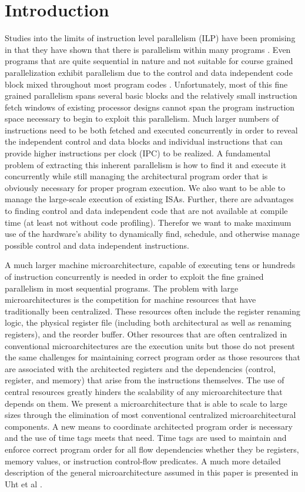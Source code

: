 \documentclass[10pt,dvips]{article}
\begin{document}
\section{Introduction}
%
Studies into the limits of instruction level parallelism (ILP) have
been promising in that they have shown that there is parallelism within
many programs \cite{Lam92,Gon97}.  
Even programs that are quite sequential in nature and
not suitable for course grained parallelization exhibit parallelism due
to the control and data independent code block mixed throughout most
program codes \cite{Uht95}. 
Unfortunately, most of this fine grained
parallelism spans several basic blocks and the relatively small
instruction fetch windows of existing processor designs cannot span
the program instruction space necessary to begin to exploit this
parallelism.  Much larger numbers of instructions need to be both fetched
and executed concurrently in order to reveal the independent control
and data blocks and individual instructions that can provide higher
instructions per clock (IPC) to be realized.  A fundamental problem of
extracting this inherent parallelism is how to find it and execute it
concurrently while still managing the architectural program order that
is obviously necessary for proper program execution.
We also want to be able to manage the large-scale execution of
existing ISAs.  Further, there are advantages to finding
control and data independent code that are not available at compile time
(at least not without code profiling).  Therefor we want to make
maximum use of the hardware's ability to dynamically find, schedule,
and otherwise manage possible control and data independent instructions.

A much larger machine microarchitecture, capable of executing tens or
hundreds of instruction concurrently
is needed in order to exploit the fine grained parallelism in most sequential
programs.  The problem with large microarchitectures is the
competition for machine resources that have traditionally been
centralized.  These resources often include the register renaming logic, the
physical register file (including both architectural as well as renaming 
registers),
and the reorder buffer.  Other resources that are often centralized
in conventional microarchitectures are the execution units but those
do not present the same challenges for maintaining correct program order
as those resources that are associated with the architected registers
and the dependencies (control, register, and memory) that arise
from the instructions themselves.  The use of central resources
greatly hinders the scalability of any microarchitecture that
depends on them.
We present a microarchitecture that is able to scale to large sizes
through the
elimination of most conventional centralized microarchitectural components.
A new means to coordinate architected program order is necessary and
the use of time tags meets that need.  Time tags are used to maintain
and enforce correct program order for all flow dependencies whether
they be registers, memory values, or instruction control-flow predicates.
A much more detailed description of the general microarchitecture
assumed in this paper is presented in Uht et al \cite{Uht01}.
\end{document}
